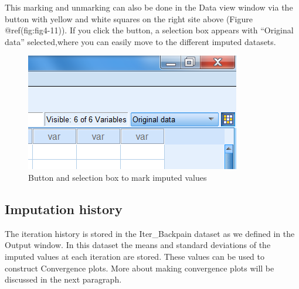 \documentclass[
]{book}
\begin{document}
This marking and unmarking can also be done in the Data view window via
the button with yellow and white squares on the right site above (Figure
@ref(fig:fig4-11)). If you click the button, a selection box appears
with ``Original data'' selected,where you can easily move to the
different imputed datasets.

\begin{figure}

{\centering \includegraphics[width=0.9\linewidth]{images/fig4.11} 

}

\caption{Button and selection box to mark imputed values}\label{fig:fig4-11}
\end{figure}

\hypertarget{imputation-history}{%
\subsection{Imputation history}\label{imputation-history}}

The iteration history is stored in the Iter\_Backpain dataset as we
defined in the Output window. In this dataset the means and standard
deviations of the imputed values at each iteration are stored. These
values can be used to construct Convergence plots. More about making
convergence plots will be discussed in the next paragraph.
\end{document}
